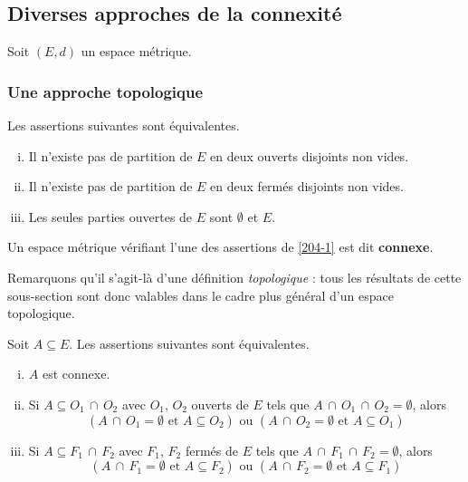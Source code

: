 



	
	\subsection{Diverses approches de la connexité}
	
	Soit $(E,d)$ un espace métrique.
	
	\subsubsection{Une approche topologique}
	
	
	\begin{proposition}
		\label{204-1}
		Les assertions suivantes sont équivalentes.
		\begin{enumerate}[(i)]
			\item Il n'existe pas de partition de $E$ en deux ouverts disjoints non vides.
			\item Il n'existe pas de partition de $E$ en deux fermés disjoints non vides.
			\item Les seules parties ouvertes de $E$ sont $\emptyset$ et $E$.
		\end{enumerate}
	\end{proposition}
	
	\begin{definition}
		Un espace métrique vérifiant l'une des assertions de \cref{204-1} est dit \textbf{connexe}.
	\end{definition}
	
	\begin{remark}
		Remarquons qu'il s'agit-là d'une définition \textit{topologique} : tous les résultats de cette sous-section sont donc valables dans le cadre plus général d'un espace topologique.
	\end{remark}
	
	\begin{proposition}
		Soit $A \subseteq E$. Les assertions suivantes sont équivalentes.
		\begin{enumerate}[(i)]
			\item $A$ est connexe.
			\item Si $A \subseteq O_1 \, \cap \, O_2$ avec $O_1$, $O_2$ ouverts de $E$ tels que $A \, \cap \, O_1 \, \cap \, O_2 = \emptyset$, alors
			\[ (A \, \cap \, O_1 = \emptyset \text{ et } A \subseteq O_2) \text{ ou } (A \, \cap \, O_2 = \emptyset \text{ et } A \subseteq O_1) \]
			\item Si $A \subseteq F_1 \, \cap \, F_2$ avec $F_1$, $F_2$ fermés de $E$ tels que $A \, \cap \, F_1 \, \cap \, F_2 = \emptyset$, alors
			\[ (A \, \cap \, F_1 = \emptyset \text{ et } A \subseteq F_2) \text{ ou } (A \, \cap \, F_2 = \emptyset \text{ et } A \subseteq F_1) \]
		\end{enumerate}
	\end{proposition}
	
